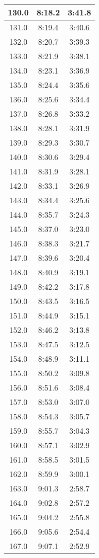 \begin{footnotesize}
\begin{minipage}{0.25\textwidth}
\begin{tabular}[t]{c|c|c}
	130.0&8:18.2&3:41.8\\\hline
	131.0&8:19.4&3:40.6\\\hline
	132.0&8:20.7&3:39.3\\\hline
	133.0&8:21.9&3:38.1\\\hline
	134.0&8:23.1&3:36.9\\\hline
	135.0&8:24.4&3:35.6\\\hline
	136.0&8:25.6&3:34.4\\\hline
	137.0&8:26.8&3:33.2\\\hline
	138.0&8:28.1&3:31.9\\\hline
	139.0&8:29.3&3:30.7\\\hline
	140.0&8:30.6&3:29.4\\\hline
	141.0&8:31.9&3:28.1\\\hline
	142.0&8:33.1&3:26.9\\\hline
	143.0&8:34.4&3:25.6\\\hline
	144.0&8:35.7&3:24.3\\\hline
	145.0&8:37.0&3:23.0\\\hline
	146.0&8:38.3&3:21.7\\\hline
	147.0&8:39.6&3:20.4\\\hline
	148.0&8:40.9&3:19.1\\\hline
	149.0&8:42.2&3:17.8\\\hline
	150.0&8:43.5&3:16.5\\\hline
	151.0&8:44.9&3:15.1\\\hline
	152.0&8:46.2&3:13.8\\\hline
	153.0&8:47.5&3:12.5\\\hline
	154.0&8:48.9&3:11.1\\\hline
	155.0&8:50.2&3:09.8\\\hline
	156.0&8:51.6&3:08.4\\\hline
	157.0&8:53.0&3:07.0\\\hline
	158.0&8:54.3&3:05.7\\\hline
	159.0&8:55.7&3:04.3\\\hline
	160.0&8:57.1&3:02.9\\\hline
	161.0&8:58.5&3:01.5\\\hline
	162.0&8:59.9&3:00.1\\\hline
	163.0&9:01.3&2:58.7\\\hline
	164.0&9:02.8&2:57.2\\\hline
	165.0&9:04.2&2:55.8\\\hline
	166.0&9:05.6&2:54.4\\\hline
	167.0&9:07.1&2:52.9\\\hline

\end{tabular}
\end{minipage}
\end{footnotesize}
